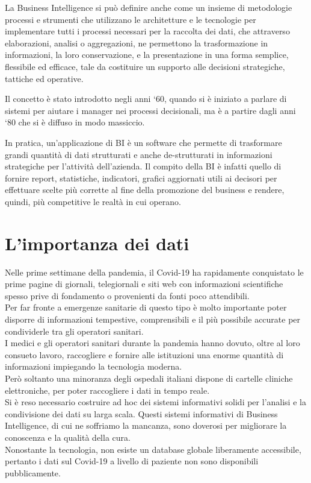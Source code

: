 La Business Intelligence si può definire anche come un insieme di metodologie processi e strumenti che utilizzano le architetture e le tecnologie per implementare tutti i processi necessari per la raccolta dei dati, che attraverso elaborazioni, analisi o aggregazioni, ne permettono la trasformazione in informazioni, la loro conservazione, e la presentazione in una forma semplice, flessibile ed efficace, tale da costituire un supporto alle decisioni strategiche, tattiche ed operative.
 
Il concetto è stato introdotto negli anni ‘60, quando si è iniziato a parlare di sistemi per aiutare i manager nei processi decisionali, ma è a partire dagli anni ‘80 che si è diffuso in modo massiccio.
 
In pratica, un'applicazione di BI è un software che permette di trasformare grandi quantità di dati strutturati e anche de-strutturati in informazioni strategiche per l'attività dell'azienda. Il compito della BI è infatti quello di fornire report, statistiche, indicatori, grafici aggiornati utili ai decisori per effettuare scelte più corrette al fine della promozione del business e rendere, quindi, più competitive le realtà in cui operano.

\section{L'importanza dei dati}
Nelle prime settimane della pandemia, il Covid-19 ha rapidamente conquistato le prime pagine di giornali, telegiornali e siti web con informazioni scientifiche spesso prive di fondamento o provenienti da fonti poco attendibili.\\
Per far fronte a emergenze sanitarie di questo tipo è molto importante poter disporre di informazioni tempestive, comprensibili e il più possibile accurate per condividerle tra gli operatori sanitari.\\
I medici e gli operatori sanitari durante la pandemia hanno dovuto, oltre al loro consueto lavoro, raccogliere e fornire alle istituzioni una enorme quantità di informazioni impiegando la tecnologia moderna.\\
Però soltanto una minoranza degli ospedali italiani dispone di cartelle cliniche elettroniche, per poter raccogliere i dati in tempo reale.\\
Si è reso necessario costruire ad hoc dei sistemi informativi solidi per l’analisi e la condivisione dei dati su larga scala.
Questi sistemi informativi di Business Intelligence, di cui ne soffriamo la mancanza, sono doverosi per migliorare la conoscenza e la qualità della cura.\\
Nonostante la tecnologia, non esiste un database globale liberamente accessibile, pertanto i dati sul Covid-19 a livello di paziente non sono disponibili pubblicamente.





